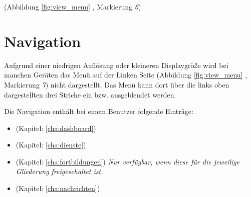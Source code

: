\noindent (Abbildung \ref{fig:view_menu} \textit{}, Markierung \textit{6})

\section{Navigation}
\label{sec:menu_navigation}
Aufgrund einer niedrigen Auflösung oder kleineren Displaygröße wird bei manchen Geräten das Menü auf der Linken Seite \noindent (Abbildung \ref{fig:view_menu} \textit{}, Markierung \textit{7}) nicht dargestellt. Das Menü kann dort über die links oben dargestellten drei Striche ein bzw. ausgeblendet werden.

\noindent Die Navigation enthält bei einem Benutzer folgende Einträge: 
\begin{itemize}
\item {} (Kapitel: \ref{cha:dashboard})
\item {} (Kapitel: \ref{cha:dienste})
\item {} (Kapitel: \ref{cha:fortbildungen}) \textit{Nur verfügbar, wenn diese für die jeweilige Gliederung freigeschaltet ist.}
\item {} (Kapitel: \ref{cha:nachrichten})

\end{itemize}